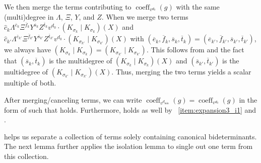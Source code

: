 \documentclass[10pt,a4paper]{amsart}
\DeclareMathOperator{\coeff}{coeff}
\begin{document}
\begin{pf}
We then merge the terms contributing to $\coeff_{v^{d_0}}(g)$ with the same (multi)degree in $\Lambda$, $\Xi$, $Y$, and $Z$.
When we merge two terms $\widehat{c}_{k} \Lambda^{\overline{e}_k}\Xi^{\overline{f}_k}Y^{\overline{s}_k}Z^{\overline{t}_k}v^{d_0}\cdot (K_{\sigma_k}\mid K_{\sigma_k})(X)$ and $\widehat{c}_{k'} \Lambda^{\overline{e}_{k'}}\Xi^{\overline{f}_{k'}}Y^{\overline{s}_{k'}}Z^{\overline{t}_{k'}}v^{d_0}\cdot (K_{\sigma_{k'}}\mid K_{\sigma_{k'}})(X)$
with $(\overline{e}_k,\overline{f}_k,\overline{s}_k,\overline{t}_k)=(\overline{e}_{k'},\overline{f}_{k'},\overline{s}_{k'},\overline{t}_{k'})$,
we always have $(K_{\sigma_{k}}\mid K_{\sigma_{k}})=(K_{\sigma_{k'}}\mid K_{\sigma_{k'}})$.
This follows from  and the fact that $(\overline{s}_{k},\overline{t}_{k})$ is the multidegree of $(K_{\sigma_{k}}\mid K_{\sigma_{k}})(X)$ and $(\overline{s}_{k'},\overline{t}_{k'})$ is the multidegree of $(K_{\sigma_{k'}}\mid K_{\sigma_{k'}})(X)$.
Thus, merging the two terms yields a scalar multiple of both.

After merging/canceling terms, we can write $\coeff_{v^{d_{\min}}}(g)=\coeff_{v^{d_0}}(g)$ in the form of  such that  holds.
Furthermore,  holds as well by ~\eqref{item:expansion3_i1} and .
\end{pf}

 helps us separate a collection of terms solely containing canonical bideterminants.
The next lemma further applies the isolation lemma to single out one term from this collection.
\end{document}
